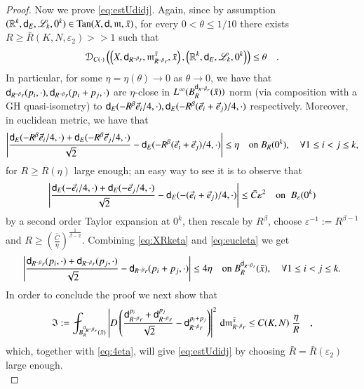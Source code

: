 \documentclass[11pt,reqno]{amsart}
\newcommand{\mm}{\mathfrak m}
\newcommand{\sfd}{{\sf d}}
\newcommand{\LL}{\mathscr{L}}
\renewcommand{\d}{{\rm{d}}}
\newcommand{\R}{\mathbb{R}}
\newcommand{\Tan}{{\rm Tan}}
\newcommand{\DC}{\mathcal D_{C(\cdot)}}
\newcommand{\vare}{\varepsilon}
\theoremstyle{definition}
\theoremstyle{remark}
\theoremstyle{remark}
\theoremstyle{remark}
\theoremstyle{remark}
\theoremstyle{remark}
\theoremstyle{remark}
\theoremstyle{remark}
\begin{document}
\begin{proof}
Now we prove \eqref{eq:estUdidj}. Again, since by assumption  $(\R^k,\sfd_{E},\LL_k,0^k) \in \Tan(X,\sfd,\mm,\bar x)$,  for every $0<\theta \leq 1/10$ there exists $R\geq \bar{R}(K,N,\vare_2)>>1$ such that
\begin{equation}\label{eq:XRketa}
\DC \left( \left(X, \sfd_{R^{-\beta} r}, \mm^{\bar{x}}_{R^{-\beta} r}, \bar{x} \right), \left( \R^k,\sfd_{E},\LL_k,0^k  \right) \right) \leq  \theta \quad . 
\end{equation}
In particular, for some $\eta=\eta(\theta)\to 0$ as $\theta\to 0$, we have that $\sfd_{R^{-\beta} r}(p_i, \cdot), \sfd_{R^{-\beta} r}(p_i+p_j, \cdot)$ are $\eta$-close in $L^\infty(B_{R}^{\sfd_{R^{-\beta} r}}(\bar x))$ norm (via composition with a GH quasi-isometry) to  $\sfd_{E}( -R^\beta \vec{e}_i/4 , \cdot), \sfd_{E}(-R^\beta(\vec{e}_i+\vec{e}_j)/4 , \cdot)$ respectively. Moreover, in euclidean metric, we have that 
\begin{equation}\label{eq:eucleta}
\left| \frac{\sfd_{E}( - R^\beta \vec{e}_i/4 , \cdot)+ \sfd_E( - R^\beta \vec{e}_j/4 , \cdot)}{\sqrt 2} -\sfd_{E}(-R^{\beta}(\vec{e}_i+\vec{e}_j)/4 , \cdot)\right| \leq \eta \quad \text{on } B_R(0^k), \quad \forall 1\leq i <j \leq k,
\end{equation}
for $R\geq  R(\eta)$ large enough; an easy way to see it is to observe that $$\left| \frac{\sfd_E( -\vec{e}_i/4, \cdot)+ \sfd_E( -\vec{e}_j/4 , \cdot)}{\sqrt 2} -\sfd_{E}(-(\vec{e}_i+\vec{e}_j)/4 , \cdot)\right| \leq \bar{C} \vare^2 \quad \text{on } \; B_{\vare}(0^k) $$ 
 by a second order Taylor expansion at $0^k$, then rescale by $R^\beta$, choose $\vare^{-1}:=R^{\beta-1}$ and $R\geq \left(\frac{\bar{C}}{\eta}\right)^{\frac{1}{\beta-2}}$.
Combining \eqref{eq:XRketa}   and \eqref{eq:eucleta} we get 
\begin{equation} \label{eq:4eta}
\left| \frac{\sfd_{R^{-\beta} r}( p_i, \cdot)+ \sfd_{R^{-\beta} r}( p_j, \cdot)}{\sqrt 2} -\sfd_{R^{-\beta} r}( p_i+p_j, \cdot)\right| \leq 4 \eta \quad \text{on } B^{\sfd_{R^{-\beta} r}}_R(\bar x), \quad \forall 1\leq i <j \leq k.
\end{equation}
In order to conclude the proof we next show that 
\begin{equation}\label{eq:ClaimOrt}
{\mathfrak {I}}:= \fint_{B^{\sfd_{R^{-\beta} r}}_R(\bar{x})} \left|D \left( \frac{\sfd_{R^{-\beta} r}^{p_i}+\sfd_{R^{-\beta} r}^{p_j}} {\sqrt 2} - \sfd_{R^{-\beta} r}^{p_i+p_j}\right) \right|^2 \, \d \mm_{R^{-\beta} r}^{\bar{x}} \leq C(K,N)\; \frac{\eta}{R}    \quad ,
\end{equation}
which, together with  \eqref{eq:4eta}, will give \eqref{eq:estUdidj}  by choosing $\bar{R}=\bar{R}(\vare_2)$ large enough. \\

\end{proof}
\end{document}
